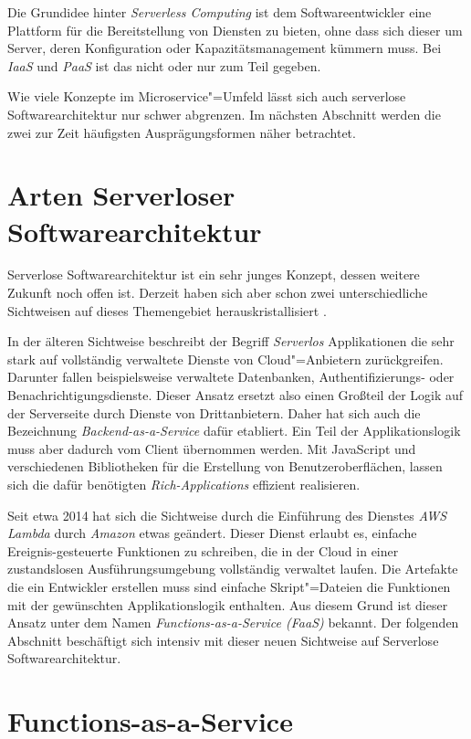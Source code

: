 Die Grundidee hinter \textit{Serverless Computing} ist dem Softwareentwickler eine Plattform für die Bereitstellung von Diensten zu bieten, ohne dass sich dieser um Server, deren Konfiguration oder Kapazitätsmanagement kümmern muss. Bei \textit{IaaS} und \textit{PaaS} ist das nicht oder nur zum Teil gegeben.

Wie viele Konzepte im Microservice"=Umfeld lässt sich auch serverlose Softwarearchitektur nur schwer abgrenzen. Im nächsten Abschnitt werden die zwei zur Zeit häufigsten Ausprägungsformen näher betrachtet.

\section{Arten Serverloser Softwarearchitektur}

Serverlose Softwarearchitektur ist ein sehr junges Konzept, dessen weitere Zukunft noch offen ist. Derzeit haben sich aber schon zwei unterschiedliche Sichtweisen auf dieses Themengebiet herauskristallisiert \cite{ServerlessArchitectures}.

In der älteren Sichtweise beschreibt der Begriff \textit{Serverlos} Applikationen die sehr stark auf vollständig verwaltete Dienste von Cloud"=Anbietern zurückgreifen. Darunter fallen beispielsweise verwaltete Datenbanken, Authentifizierungs- oder Benachrichtigungsdienste. Dieser Ansatz ersetzt also einen Großteil der Logik auf der Serverseite durch Dienste von Drittanbietern. Daher hat sich auch die Bezeichnung \textit{Backend-as-a-Service} dafür etabliert. Ein Teil der Applikationslogik muss aber dadurch vom Client übernommen werden. Mit JavaScript und verschiedenen Bibliotheken für die Erstellung von Benutzeroberflächen, lassen sich die dafür benötigten \textit{Rich-Applications} effizient realisieren.

Seit etwa 2014 hat sich die Sichtweise durch die Einführung des Dienstes \textit{AWS Lambda} durch \textit{Amazon} etwas geändert. Dieser Dienst erlaubt es, einfache Ereignis-gesteuerte Funktionen zu schreiben, die in der Cloud in einer zustandslosen Ausführungsumgebung vollständig verwaltet laufen. Die Artefakte die ein Entwickler erstellen muss sind einfache Skript"=Dateien die Funktionen mit der gewünschten Applikationslogik enthalten. Aus diesem Grund ist dieser Ansatz unter dem Namen \textit{Functions-as-a-Service (FaaS)} bekannt. Der folgenden Abschnitt beschäftigt sich intensiv mit dieser neuen Sichtweise auf Serverlose Softwarearchitektur.

\section{Functions-as-a-Service}

